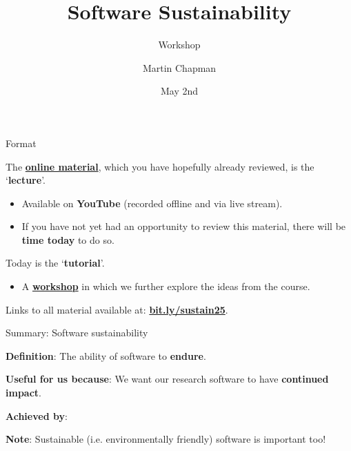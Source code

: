\documentclass[10pt, dvipsnames, table, aspectratio=169]{beamer}
\title{Software Sustainability}
\subtitle{Workshop}
\date{May 2nd}
\author{Martin Chapman}
\institute{King's College London}
\begin{document}

\maketitle


{
\begin{frame}[fragile]{Format}

    The \href{https://github.com/martinteaching/sustainability#material}{\textbf{online material}}, which you have hopefully already reviewed, is the `\textbf{lecture}'.
    
    \begin{itemize}
    
        \item Available on \textbf{YouTube} (recorded offline and via live stream).
    
        \item If you have not yet had an opportunity to review this material, there will be \textbf{time today} to do so.
    
    \end{itemize}
    
    Today is the `\textbf{tutorial}'.
    
    \begin{itemize}
    
        \item A \href{https://github.com/martinteaching/sustainability/tree/master/workshops/kcl/2025}{\textbf{workshop}} in which we further explore the ideas from the course.
    
    \end{itemize}
    
    Links to all material available at:
    \href{https://bit.ly/sustain25}{\textbf{bit.ly/sustain25}}.
    
\end{frame}
}


{
\begin{frame}[fragile]{Summary: Software sustainability}

\textbf{Definition}: The ability of software to \textbf{endure}.

\textbf{Useful for us because}: We want our research software to have \textbf{continued impact}.

\textbf{Achieved by}:

\begin{center}
    
\end{center}

\textbf{Note}: Sustainable (i.e. environmentally friendly) software is important too!

\end{frame}
}
\end{document}
